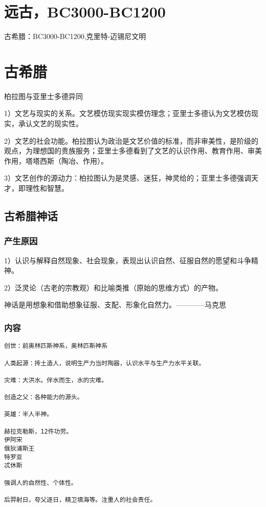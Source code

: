 \documentclass[UTF8]{../../RepresentationUniverse}
\begin{document}
\section{远古，BC3000-BC1200}

古希腊：BC3000-BC1200,克里特-迈锡尼文明


\section{古希腊}

\begin{proposition}
    柏拉图与亚里士多德异同

    1）文艺与现实的关系。文艺模仿现实现实模仿理念；亚里士多德认为文艺模仿现实，承认文艺的现实性。
    
    2）文艺的社会功能。柏拉图认为政治是文艺价值的标准，而非审美性，是阶级的观点，为理想国的贵族服务；亚里士多德看到了文艺的认识作用、教育作用、审美作用，塔塔西斯（陶冶、作用）。
    
    3）文艺创作的源动力：柏拉图认为是灵感、迷狂，神灵给的；亚里士多德强调天才，即理性和智慧。
\end{proposition}



\subsection{古希腊神话}

\subsubsection{产生原因}

1）认识与解释自然现象、社会现象，表现出认识自然、征服自然的愿望和斗争精神。

2）泛灵论（古老的宗教观）和比喻类推（原始的思维方式）的产物。

神话是用想象和借助想象征服、支配、形象化自然力。————马克思


\subsubsection{内容}

\begin{lstlisting}
创世：前奥林匹斯神系，奥林匹斯神系

人类起源：抟土造人，说明生产力当时陶器，认识水平与生产力水平关联。

灾难：大洪水。伴水而生，水的灾难。

创造之父：各种能力的源头。

英雄：半人半神。

赫拉克勒斯，12件功劳。
伊阿宋
俄狄浦斯王
特罗亚
忒休斯

强调人的自然性、个体性。

后羿射日，夸父逐日，精卫填海等。注重人的社会责任。
\end{lstlisting}
\end{document}
